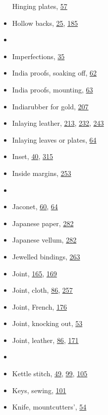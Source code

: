 \documentclass[
]{article}
\begin{document}
\begin{itemize}
  Hinging plates, \protect\hyperlink{Page_57}{57}
\item
  Hollow backs, \protect\hyperlink{Page_25}{25},
  \protect\hyperlink{Page_185}{185}
\item
  ~
\item
  {Imperfections}, \protect\hyperlink{Page_35}{35}
\item
  India proofs, soaking off, \protect\hyperlink{Page_62}{62}
\item
  India proofs, mounting, \protect\hyperlink{Page_63}{63}
\item
  Indiarubber for gold, \protect\hyperlink{Page_207}{207}
\item
  Inlaying leather, \protect\hyperlink{Page_213}{213},
  \protect\hyperlink{Page_232}{232}, \protect\hyperlink{Page_243}{243}
\item
  Inlaying leaves or plates, \protect\hyperlink{Page_64}{64}
\item
  Inset, \protect\hyperlink{Page_40}{40},
  \protect\hyperlink{Page_315}{315}
\item
  Inside margins, \protect\hyperlink{Page_253}{253}
\item
  ~
\item
  {Jaconet}, \protect\hyperlink{Page_60}{60},
  \protect\hyperlink{Page_64}{64}
\item
  Japanese paper, \protect\hyperlink{Page_282}{282}
\item
  Japanese vellum, \protect\hyperlink{Page_282}{282}
\item
  Jewelled bindings, \protect\hyperlink{Page_263}{263}
\item
  \protect\hypertarget{Joint}{}{}Joint,
  \protect\hyperlink{Page_165}{165}, \protect\hyperlink{Page_169}{169}
\item
  Joint, cloth, \protect\hyperlink{Page_86}{86},
  \protect\hyperlink{Page_257}{257}
\item
  Joint, French, \protect\hyperlink{Page_176}{176}
\item
  Joint, knocking out, \protect\hyperlink{Page_53}{53}
\item
  Joint, leather, \protect\hyperlink{Page_86}{86},
  \protect\hyperlink{Page_171}{171}
\item
  ~
\item
  {Kettle} stitch, \protect\hyperlink{Page_49}{49},
  \protect\hyperlink{Page_99}{99}, \protect\hyperlink{Page_105}{105}
\item
  Keys, sewing, \protect\hyperlink{Page_101}{101}
\item
  Knife, mountcutters', \protect\hyperlink{Page_54}{54}

\end{itemize}
\end{document}

